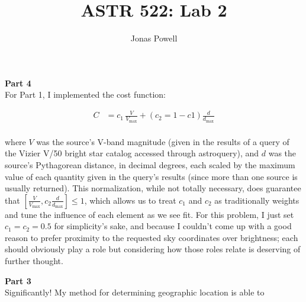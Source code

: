 \documentclass[12pt]{article}
\begin{document}
\title{\textbf{ASTR 522: Lab 2}}
\author{Jonas Powell}
\maketitle


\begin{onehalfspacing}


\iffalse
For part 1, describe the methodology you used to determine most probable astronomical source.
\fi
\raggedright{\textbf{\Large Part 4}}\\

For Part 1, I implemented the cost function:

\begin{align*}
  C &= c_1 \, \frac{V}{V_{\text{max}}} + (c_2 = 1 - c1) \frac{d}{d_{\text{max}}} \\
\end{align*}

where $V$ was the source's V-band magnitude (given in the results of a query of the Vizier V/50 bright star catalog accessed through astroquery), and $d$ was the source's Pythagorean distance, in decimal degrees, each scaled by the maximum value of each quantity given in the query's results (since more than one source is usually returned). This normalization, while not totally necessary, does guarantee that $[\frac{V}{V_{\text{max}}}, c_2 \frac{d}{d_{\text{max}}}] \leq 1$, which allows us to treat $c_1$ and $c_2$ as traditionally weights and tune the influence of each element as we see fit. For this problem, I just set $c_1 = c_2 = 0.5$ for simplicity's sake, and because I couldn't come up with a good reason to prefer proximity to the requested sky coordinates over brightness; each should obviously play a role but considering how those roles relate is deserving of further thought.




\iffalse
For part 2, how does the uncertainty in your geographic position compare with the uncertainty in astronomical coordinates from the previous problem? 
\fi
\raggedright{\textbf{\Large Part 3}}\\
Significantly! My method for determining geographic location is able to 




\newpage



\end{onehalfspacing}
\end{document}

